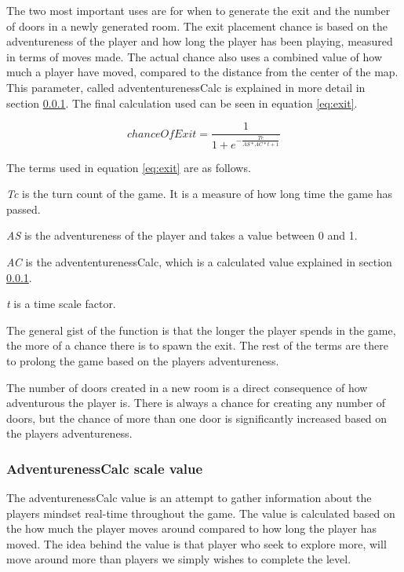 \documentclass[conference,compsoc]{IEEEtran}
\begin{document}
The two most important uses are for when to generate the exit and the number of doors in a newly generated room. 
The exit placement chance is based on the adventureness of the player and how long the player has been playing, measured in terms of moves made.
The actual chance also uses a combined value of how much a player have moved, compared to the distance from the center of the map. This parameter, called advententurenessCalc is explained in more detail in section \ref{sec:adventCalc}. 
The final calculation used can be seen in equation \ref{eq:exit}.

\begin{equation}
\label{eq:exit}
chanceOfExit = \frac{1}{1 + e^{-\frac{Tc}{AS*AC*t+1}}}
\end{equation}

The terms used in equation \ref{eq:exit} are as follows. 

\textit{Tc} is the turn count of the game. It is a measure of how long time the game has passed.

\textit{AS} is the adventureness of the player and takes a value between 0 and 1. 

\textit{AC} is the advententurenessCalc, which is a calculated value explained in section \ref{sec:adventCalc}.

\textit{t} is a time scale factor.

The general gist of the function is that the longer the player spends in the game, the more of a chance there is to spawn the exit. The rest of the terms are there to prolong the game based on the players adventureness.

The number of doors created in a new room is a direct consequence of how adventurous the player is. There is always a chance for creating any number of doors, but the chance of more than one door is significantly increased based on the players adventureness.

\subsubsection{AdventurenessCalc scale value}
\label{sec:adventCalc}
The adventurenessCalc value is an attempt to gather information about the players mindset real-time throughout the game.
The value is calculated based on the how much the player moves around compared to how long the player has moved. The idea behind the value is that player who seek to explore more, will move around more than players we simply wishes to complete the level. 
\end{document}

